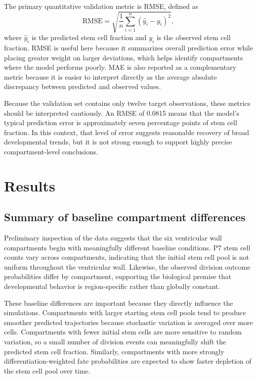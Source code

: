 \documentclass[12pt]{article}
\begin{document}
The primary quantitative validation metric is RMSE, defined as
\[
\mathrm{RMSE}=\sqrt{\frac{1}{n}\sum_{i=1}^{n}(\hat{y}_i-y_i)^2},
\]
where $\hat{y}_i$ is the predicted stem cell fraction and $y_i$ is the observed stem cell fraction. RMSE is useful here because it summarizes overall prediction error while placing greater weight on larger deviations, which helps identify compartments where the model performs poorly. MAE is also reported as a complementary metric because it is easier to interpret directly as the average absolute discrepancy between predicted and observed values.

Because the validation set contains only twelve target observations, these metrics should be interpreted cautiously. An RMSE of 0.0815 means that the model's typical prediction error is approximately seven percentage points of stem cell fraction. In this context, that level of error suggests reasonable recovery of broad developmental trends, but it is not strong enough to support highly precise compartment-level conclusions.

\section{Results}

\subsection{Summary of baseline compartment differences}

Preliminary inspection of the data suggests that the six ventricular wall compartments begin with meaningfully different baseline conditions. P7 stem cell counts vary across compartments, indicating that the initial stem cell pool is not uniform throughout the ventricular wall. Likewise, the observed division outcome probabilities differ by compartment, supporting the biological premise that developmental behavior is region-specific rather than globally constant.

These baseline differences are important because they directly influence the simulations. Compartments with larger starting stem cell pools tend to produce smoother predicted trajectories because stochastic variation is averaged over more cells. Compartments with fewer initial stem cells are more sensitive to random variation, so a small number of division events can meaningfully shift the predicted stem cell fraction. Similarly, compartments with more strongly differentiation-weighted fate probabilities are expected to show faster depletion of the stem cell pool over time.
\end{document}
